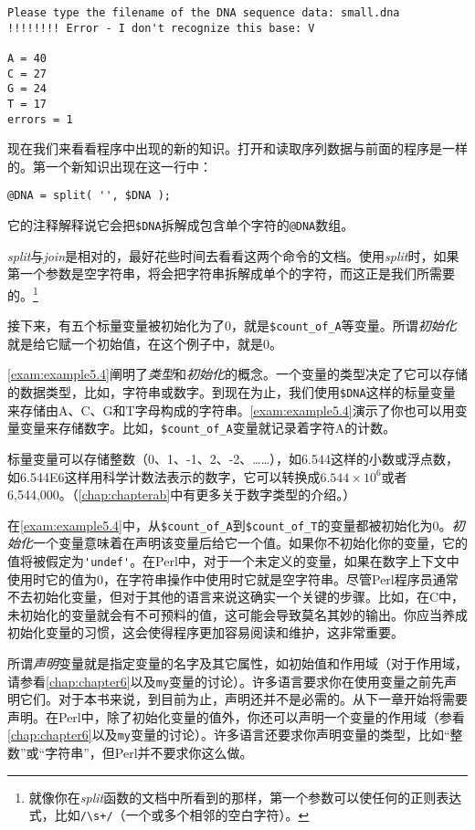 \begin{lstlisting}
Please type the filename of the DNA sequence data: small.dna
!!!!!!!! Error - I don't recognize this base: V

A = 40
C = 27
G = 24
T = 17
errors = 1
\end{lstlisting}

现在我们来看看程序中出现的新的知识。打开和读取序列数据与前面的程序是一样的。第一个新知识出现在这一行中：

\begin{lstlisting}
@DNA = split( '', $DNA );
\end{lstlisting}

它的注释解释说它会把\verb|$DNA|拆解成包含单个字符的\verb|@DNA|数组。

\textit{split}与\textit{join}是相对的，最好花些时间去看看这两个命令的文档。使用\textit{split}时，如果第一个参数是空字符串，将会把字符串拆解成单个的字符，而这正是我们所需要的。\footnote{就像你在\textit{split}函数的文档中所看到的那样，第一个参数可以使任何的正则表达式，比如\verb|/\s+/|（一个或多个相邻的空白字符）。}

接下来，有五个标量变量被初始化为了0，就是\verb|$count_of_A|等变量。所谓\textit{初始化}就是给它赋一个初始值，在这个例子中，就是0。

\autoref{exam:example5.4}阐明了\textit{类型}和\textit{初始化}的概念。一个变量的类型决定了它可以存储的数据类型，比如，字符串或数字。到现在为止，我们使用\verb|$DNA|这样的标量变量来存储由A、C、G和T字母构成的字符串。\autoref{exam:example5.4}演示了你也可以用变量变量来存储数字。比如，\verb|$count_of_A|变量就记录着字符A的计数。

标量变量可以存储整数（0、1、-1、2、-2、……），如6.544这样的小数或浮点数，如6.544E6这样用科学计数法表示的数字，它可以转换成$6.544 \times 10^6$或者6,544,000。（\autoref{chap:chapterab}中有更多关于数字类型的介绍。）

在\autoref{exam:example5.4}中，从\verb|$count_of_A|到\verb|$count_of_T|的变量都被初始化为0。\textit{初始化}一个变量意味着在声明该变量后给它一个值。如果你不初始化你的变量，它的值将被假定为\verb|'undef'|。在Perl中，对于一个未定义的变量，如果在数字上下文中使用时它的值为0，在字符串操作中使用时它就是空字符串。尽管Perl程序员通常不去初始化变量，但对于其他的语言来说这确实一个关键的步骤。比如，在C中，未初始化的变量就会有不可预料的值，这可能会导致莫名其妙的输出。你应当养成初始化变量的习惯，这会使得程序更加容易阅读和维护，这非常重要。

所谓\textit{声明}变量就是指定变量的名字及其它属性，如初始值和作用域（对于作用域，请参看\autoref{chap:chapter6}以及\verb|my|变量的讨论）。许多语言要求你在使用变量之前先声明它们。对于本书来说，到目前为止，声明还并不是必需的。从下一章开始将需要声明。在Perl中，除了初始化变量的值外，你还可以声明一个变量的作用域（参看\autoref{chap:chapter6}以及\verb|my|变量的讨论）。许多语言还要求你声明变量的类型，比如“整数”或“字符串”，但Perl并不要求你这么做。

